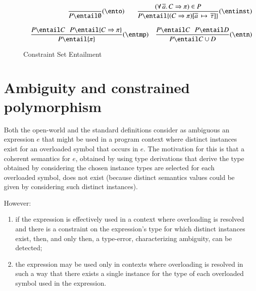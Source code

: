 \documentclass[review]{elsarticle}
\begin{document}
\begin{figure}
   \[ \begin{array}{r}
         \begin{array}{cr}
   		\displaystyle\frac{}{P \entail \emptyset} (\ento)\hspace*{.3cm} &
		\displaystyle\frac
                        {(\forall\,\overline{a}.\,C\Rightarrow \pi) \in P}
			{P \entail \{ (C\Rightarrow\pi)[\overline{a}\,\mapsto\,\overline{\tau}] \} }
			(\entinst)
         \end{array}\\ \\
         \begin{array}{cr}
		\displaystyle\frac
			{P \entail C \:\:\: P \entail \{C\Rightarrow\pi\} }
			{P \entail \{ \pi \}} (\entmp)
			&
		\displaystyle\frac
			{P \entail C \:\:\: P \entail D}
			{P \entail C \cup D} (\entn)
	 \end{array}
       \end{array}
   \]
\caption{Constraint Set Entailment}
\label{Entailment-fig}
\end{figure}

\section{Ambiguity and constrained polymorphism}
\label{Haskell-and-standard-ambiguity}

Both the open-world and the standard definitions consider as ambiguous
an expression $e$ that might be used in a program context where
distinct instances exist for an overloaded symbol that occurs in
$e$. The motivation for this is that a coherent semantics for $e$,
obtained by using type derivations that derive the type obtained by
considering the chosen instance types are selected for each overloaded
symbol, does not exist (because distinct semantics values could be
given by considering such distinct instances).

However:

\begin{enumerate}

   \item if the expression is effectively used in a context where
     overloading is resolved and there is a constraint on the
     expression's type for which distinct instances exist, then, and
     only then, a type-error, characterizing ambiguity, can be
     detected;

   \item the expression may be used only in contexts where overloading
     is resolved in such a way that there exists a single instance for
     the type of each overloaded symbol used in the expression.

\end{enumerate}
\end{document}
